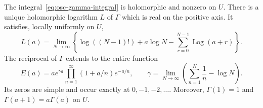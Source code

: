 \begin{lemma}
\label{lem:osc-gamma}
The integral~\eqref{eq:osc-gamma-integral} is holomorphic and nonzero on
\(U\). There is a unique holomorphic logarithm \(L\) of \(\Gamma\)
which is real on the positive axis. It satisfies, locally uniformly on \(U\),
\begin{equation}
 L(a)=\lim_{N\to\infty}
 \left\{\log((N-1)!)+a\log N
              -\sum_{r=0}^{N-1}\operatorname{Log}(a+r)\right\}.
 \label{eq:osc-gamma-log-limit}
\end{equation}
The reciprocal of \(\Gamma\) extends to the entire function
\begin{equation}
 E(a)=a e^{\gamma a}\prod_{n=1}^{\infty}(1+a/n)e^{-a/n},
 \qquad
 \gamma=\lim_{N\to\infty}\left(\sum_{n=1}^N\frac1n-\log N\right).
 \label{eq:osc-gamma-product}
\end{equation}
Its zeros are simple and occur exactly at \(0,-1,-2,\ldots\).
Moreover, \(\Gamma(1)=1\) and \(\Gamma(a+1)=a\Gamma(a)\) on \(U\).
\end{lemma}

